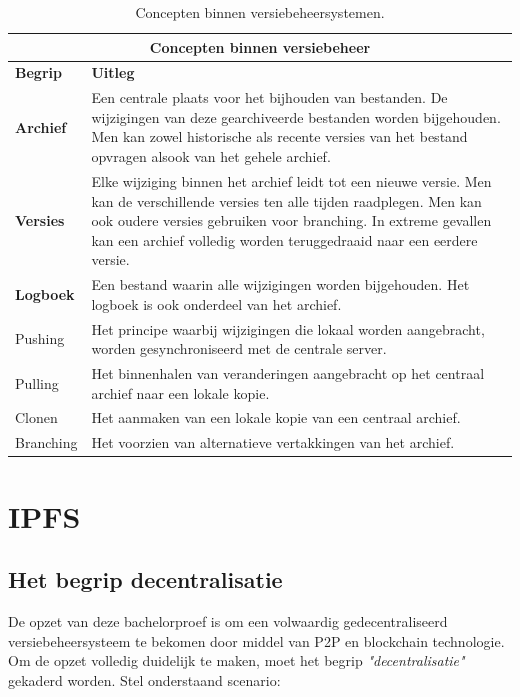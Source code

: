 \begin{table}[h!]
	\centering
	\begin{tabular}{ |p{2cm}|p{12cm}|}
 		\hline
 		\multicolumn{2}{|c|}{\large \textbf{Concepten binnen versiebeheer}} \\
 		\hline
 		\textbf{Begrip}	& \textbf{Uitleg}\\
 		\hline
 		\textbf{Archief} & Een centrale plaats voor het bijhouden van bestanden. De wijzigingen van deze gearchiveerde bestanden worden bijgehouden. Men kan zowel historische als recente versies van het bestand opvragen alsook van het gehele archief.\\
 		\hline
 		\textbf{Versies} & Elke wijziging binnen het archief leidt tot een nieuwe versie. Men kan de verschillende versies ten alle tijden raadplegen. Men kan ook oudere versies gebruiken voor branching. In extreme gevallen kan een archief volledig worden teruggedraaid naar een eerdere versie.\\
 		\hline
		\textbf{Logboek} & Een bestand waarin alle wijzigingen worden bijgehouden. Het logboek is ook onderdeel van het archief. \\
		\hline
		Pushing	& Het principe waarbij wijzigingen die lokaal worden aangebracht, worden gesynchroniseerd met de centrale server.\\
		\hline
		Pulling & Het binnenhalen van veranderingen aangebracht op het centraal archief naar een lokale kopie.\\
		\hline
		Clonen & Het aanmaken van een lokale kopie van een centraal archief. \\
		Branching & Het voorzien van alternatieve vertakkingen van het archief. \\
		\hline
	\end{tabular}
	\label{tbl_concepts}
	\caption{Concepten binnen versiebeheersystemen.}
\end{table}
\newpage
\section{IPFS}
\label{IPFS}
\subsection{Het begrip decentralisatie}
\label{ipfs_decent}
De opzet van deze bachelorproef is om een volwaardig gedecentraliseerd versiebeheersysteem te bekomen door middel van P2P en blockchain technologie. Om de opzet volledig duidelijk te maken, moet het begrip \textit{"decentralisatie"} gekaderd worden. Stel onderstaand scenario:\\

